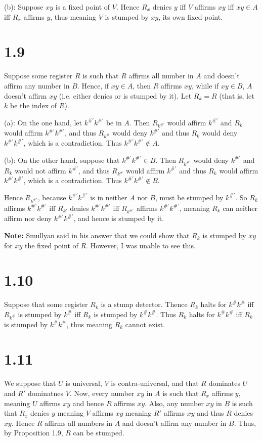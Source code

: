 \documentclass{article}
\theoremstyle{definition}
\begin{document}
(b): Suppose $xy$ is a fixed point of $V$. Hence $R_x$ denies $y$ iff $V$ affirms $xy$ iff $xy\in A$ iff $R_x$ affirms $y$, thus meaning $V$ is 
stumped by $xy$, its own fixed point.

\section*{1.9}
Suppose some register $R$ is such that $R$ affirms all number in $A$ and doesn't affirm any number in $B$. Hence, if $xy\in A$, then $R$ affirms 
$xy$, while if $xy\in B$, $A$ doesn't affirm $xy$ (i.e. either denies or is stumped by it). Let $R_k=R$ (that is, let $k$ be the index of $R$). 


(a): On the one hand, let $k^{\#'}k^{\#'}$ be in $A$. Then $R_{k^{\#'}}$ would affirm $k^{\#'}$ and $R_k$ would affirm $k^{\#'}k^{\#'}$, and thus 
$R_{k^\#}$ would deny $k^{\#'}$ and thus $R_k$ would deny $k^{\#'}k^{\#'}$, which is a contradiction. Thus $k^{\#'}k^{\#'}\notin A$.


(b): On the other hand, suppose that $k^{\#'}k^{\#'}\in B$. Then $R_{k^{\#'}}$ would deny $k^{\#'}$ and $R_k$ would not affirm $k^{\#'}$, and thus 
$R_{k^\#}$ would affirm $k^{\#'}$ and thus $R_k$ would affirm $k^{\#'}k^{\#'}$, which is a contradiction. Thus $k^{\#'}k^{\#'}\notin B$.


Hence $R_{k^{\#'}}$, because $k^{\#'}k^{\#'}$ is in neither $A$ nor $B$, must be stumped by $k^{\#'}$. So $R_k$ affirms 
$k^{\#'}k^{\#'}$ iff $R_{k'}$ denies $k^{\#'}k^{\#'}$ iff $R_{k^{\#'}}$ affirms $k^{\#'}k^{\#'}$, meaning $R_k$ can neither affirm nor deny 
$k^{\#'}k^{\#'}$, and hence is stumped by it.


\textbf{Note:} Smullyan said in his answer that we could show that $R_k$ is stumped by $xy$ for $xy$ the fixed point of $R$. However, I was unable to see 
this. 

\section*{1.10}
Suppose that some register $R_k$ is a stump detector. Thence $R_k$ halts for $k^\#k^\#$ iff $R_{k^\#}$ is stumped by $k^\#$ iff 
$R_k$ is stumped by $k^\#k^\#$. Thus $R_k$ halts for $k^\#k^\#$ iff $R_k$ is stumped by $k^\#k^\#$, thus meaning $R_k$ cannot exist.

\section*{1.11}
We suppose that $U$ is universal, $V$ is contra-universal, and that $R$ dominates $U$ and $R'$ dominatnes $V$. 
Now, every number $xy$ in $A$ is such that $R_x$ affirms $y$, meaning $U$ affirms $xy$ and hence $R$ affirms $xy$. Also, any number $xy$ in $B$ is 
such that $R_x$ denies $y$ meaning $V$ affirms $xy$ meaning $R'$ affirms $xy$ and thus $R$ denies $xy$. Hence $R$ affirms all numbers in $A$ and doesn't 
affirm any number in $B$. Thus, by Proposition 1.9, $R$ can be stumped. 
\end{document}
